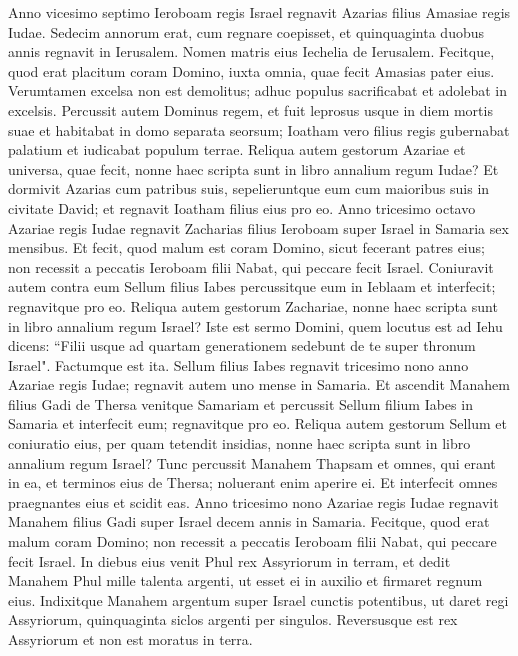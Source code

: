 \begin{biblechapter}  
\verse Anno vicesimo septimo Ieroboam regis Israel regnavit Azarias filius Amasiae regis Iudae. 
\verse Sedecim annorum erat, cum regnare coepisset, et quinquaginta duobus annis regnavit in Ierusalem. Nomen matris eius Iechelia de Ierusalem.  
\verse Fecitque, quod erat placitum coram Domino, iuxta omnia, quae fecit Amasias pater eius. 
\verse Verumtamen excelsa non est demolitus; adhuc populus sacrificabat et adolebat in excelsis. 
\verse Percussit autem Dominus regem, et fuit leprosus usque in diem mortis suae et habitabat in domo separata seorsum; Ioatham vero filius regis gubernabat palatium et iudicabat populum terrae. 
\verse Reliqua autem gestorum Azariae et universa, quae fecit, nonne haec scripta sunt in libro annalium regum Iudae? 
\verse Et dormivit Azarias cum patribus suis, sepelieruntque eum cum maioribus suis in civitate David; et regnavit Ioatham filius eius pro eo. 
\verse Anno tricesimo octavo Azariae regis Iudae regnavit Zacharias filius Ieroboam super Israel in Samaria sex mensibus. 
\verse Et fecit, quod malum est coram Domino, sicut fecerant patres eius; non recessit a peccatis Ieroboam filii Nabat, qui peccare fecit Israel. 
\verse Coniuravit autem contra eum Sellum filius Iabes percussitque eum in Ieblaam et interfecit; regnavitque pro eo. 
\verse Reliqua autem gestorum Zachariae, nonne haec scripta sunt in libro annalium regum Israel? 
\verse Iste est sermo Domini, quem locutus est ad Iehu dicens: “Filii usque ad quartam generationem sedebunt de te super thronum Israel". Factumque est ita. 
\verse Sellum filius Iabes regnavit tricesimo nono anno Azariae regis Iudae; regnavit autem uno mense in Samaria. 
\verse Et ascendit Manahem filius Gadi de Thersa venitque Samariam et percussit Sellum filium Iabes in Samaria et interfecit eum; regnavitque pro eo. 
\verse Reliqua autem gestorum Sellum et coniuratio eius, per quam tetendit insidias, nonne haec scripta sunt in libro annalium regum Israel? 
\verse Tunc percussit Manahem Thapsam et omnes, qui erant in ea, et terminos eius de Thersa; noluerant enim aperire ei. Et interfecit omnes praegnantes eius et scidit eas. 
\verse Anno tricesimo nono Azariae regis Iudae regnavit Manahem filius Gadi super Israel decem annis in Samaria. 
\verse Fecitque, quod erat malum coram Domino; non recessit a peccatis Ieroboam filii Nabat, qui peccare fecit Israel. In diebus eius 
\verse venit Phul rex Assyriorum in terram, et dedit Manahem Phul mille talenta argenti, ut esset ei in auxilio et firmaret regnum eius. 
\verse Indixitque Manahem argentum super Israel cunctis potentibus, ut daret regi Assyriorum, quinquaginta siclos argenti per singulos. Reversusque est rex Assyriorum et non est moratus in terra. 

\end{biblechapter}
